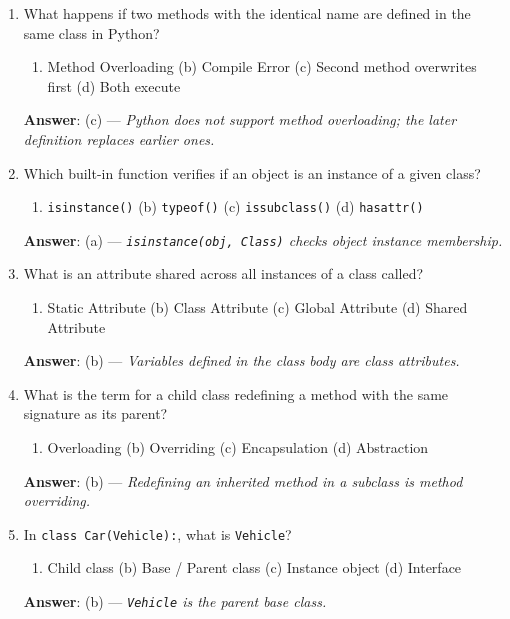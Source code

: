 \begin{enumerate}[leftmargin=1.5em]
    \item What happens if two methods with the identical name are defined in the same class in Python?
    \begin{enumerate}[label=(\alph*)]
        \item Method Overloading \quad (b) Compile Error \quad (c) Second method overwrites first \quad (d) Both execute
    \end{enumerate}
    \textbf{Answer}: (c) --- \textit{Python does not support method overloading; the later definition replaces earlier ones.}

    \item Which built-in function verifies if an object is an instance of a given class?
    \begin{enumerate}[label=(\alph*)]
        \item \texttt{isinstance()} \quad (b) \texttt{typeof()} \quad (c) \texttt{issubclass()} \quad (d) \texttt{hasattr()}
    \end{enumerate}
    \textbf{Answer}: (a) --- \textit{\texttt{isinstance(obj, Class)} checks object instance membership.}

    \item What is an attribute shared across all instances of a class called?
    \begin{enumerate}[label=(\alph*)]
        \item Static Attribute \quad (b) Class Attribute \quad (c) Global Attribute \quad (d) Shared Attribute
    \end{enumerate}
    \textbf{Answer}: (b) --- \textit{Variables defined in the class body are class attributes.}

    \item What is the term for a child class redefining a method with the same signature as its parent?
    \begin{enumerate}[label=(\alph*)]
        \item Overloading \quad (b) Overriding \quad (c) Encapsulation \quad (d) Abstraction
    \end{enumerate}
    \textbf{Answer}: (b) --- \textit{Redefining an inherited method in a subclass is method overriding.}

    \item In \texttt{class Car(Vehicle):}, what is \texttt{Vehicle}?
    \begin{enumerate}[label=(\alph*)]
        \item Child class \quad (b) Base / Parent class \quad (c) Instance object \quad (d) Interface
    \end{enumerate}
    \textbf{Answer}: (b) --- \textit{\texttt{Vehicle} is the parent base class.}


\end{enumerate}
